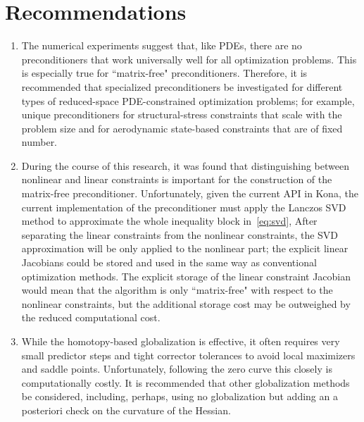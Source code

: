
\section{Recommendations}

\begin{enumerate}

\item The numerical experiments suggest that, like PDEs, there are no preconditioners that work universally well for all optimization problems.  This is especially true for ``matrix-free" preconditioners.  Therefore, it is recommended that specialized preconditioners be investigated for different types of reduced-space PDE-constrained optimization problems; for example, unique preconditioners for structural-stress constraints that scale with the problem size and for aerodynamic state-based constraints that are of fixed number.

\item During the course of this research, it was found that distinguishing between nonlinear and linear constraints is important for the construction of the matrix-free preconditioner. 
Unfortunately, given the current API in Kona, the current implementation of the preconditioner must apply the Lanczos SVD method to approximate the whole inequality block in~\eqref{eq:svd}, 
After separating the linear constraints from the nonlinear constraints, the SVD
approximation will be only applied to the nonlinear part; the explicit linear Jacobians could be stored and used in the same way as  conventional optimization methods. 
The explicit storage of the linear constraint Jacobian would mean that the algorithm is only ``matrix-free" with respect to the nonlinear constraints, but the additional storage cost may be outweighed by the reduced computational cost. 

\item While the homotopy-based globalization is effective, it often requires very small predictor steps and tight corrector tolerances to avoid local maximizers and saddle points.  Unfortunately, following the zero curve this closely is computationally costly.  It is recommended that other globalization methods be considered, including, perhaps, using no globalization but adding an a posteriori check on the curvature of the Hessian. 


\end{enumerate}
